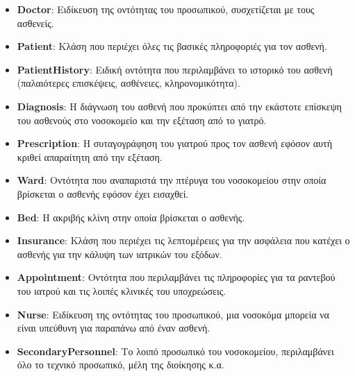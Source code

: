 \documentclass{article}
\begin{document}
\begin{itemize}
    \item \textbf{Doctor}: Ειδίκευση της οντότητας του προσωπικού, συσχετίζεται με τους ασθενείς.
    \item \textbf{Patient}: Κλάση που περιέχει όλες τις βασικές πληροφοριές για τον ασθενή.
    \item \textbf{PatientHistory}: Ειδική οντότητα που περιλαμβάνει το ιστορικό του ασθενή (παλαιότερες επισκέψεις, ασθένειες, κληρονομικότητα).
    \item \textbf{Diagnosis}: Η διάγνωση του ασθενή που προκύπτει από την εκάστοτε επίσκεψη του ασθενούς στο νοσοκομείο και την εξέταση από το γιατρό.
    \item \textbf{Prescription}: Η συταγογράφηση του γιατρού προς τον ασθενή εφόσον αυτή κριθεί απαραίτητη από την εξέταση.
    \item \textbf{Ward}: Οντότητα που αναπαριστά την πτέρυγα του νοσοκομείου στην οποία βρίσκεται ο ασθενής εφόσον έχει εισαχθεί.
    \item \textbf{Bed}: Η ακριβής κλίνη στην οποία βρίσκεται ο ασθενής.
    \item \textbf{Insurance}: Κλάση που περιέχει τις λεπτομέρειες για την ασφάλεια που κατέχει ο ασθενής για την κάλυψη των ιατρικών του εξόδων.
    \item \textbf{Appointment}: Οντότητα που περιλαμβάνει τις πληροφορίες για τα ραντεβού του ιατρού και τις λοιπές κλινικές του υποχρεώσεις.
    \item \textbf{Nurse}: Ειδίκευση της οντότητας του προσωπικού, μια νοσοκόμα μπορεία να είναι υπεύθυνη για παραπάνω από έναν ασθενή.
    \item \textbf{SecondaryPersonnel}: Το λοιπό προσωπικό του νοσοκομείου, περιλαμβάνει όλο το τεχνικό προσωπικό, μέλη της διοίκησης κ.α.
\end{itemize}
\end{document}
